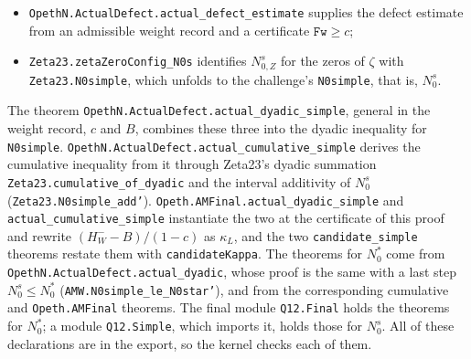 \documentclass[11pt]{article}
\theoremstyle{definition}
\newcommand{\eps}{\varepsilon}
\begin{document}
\begin{sloppypar}
\begin{itemize}
configuration $Z$ that satisfies the analytic inputs of Zeta23, any $0<c<1$,
$B\ge0$ and any defect estimate with these $c$ and $B$, that for every
$\eps>0$ and all large $T$,
$\big((H_W^--B)/(1-c)-\eps\big)N_Z(T,2T)\le N^s_{0,Z}(T,2T)$, where $N^s_{0,Z}$
counts the simple on-line points of $Z$;
\item \texttt{OpethN.\allowbreak ActualDefect.\allowbreak actual\_defect\_estimate}
supplies the defect estimate from an admissible weight record and a
certificate $\texttt{Fw}\ge c$;
\item \texttt{Zeta23.\allowbreak zetaZeroConfig\_N0s} identifies $N^s_{0,Z}$ for
the zeros of $\zeta$ with \texttt{Zeta23.N0simple}, which unfolds to the
challenge's \texttt{N0simple}, that is, $N_0^s$.
\end{itemize}
The theorem \texttt{OpethN.\allowbreak ActualDefect.\allowbreak actual\_dyadic\_simple},
general in the weight record, $c$ and $B$, combines these three into the
dyadic inequality for \texttt{N0simple}.
\texttt{OpethN.\allowbreak ActualDefect.\allowbreak actual\_cumulative\_simple}
derives the cumulative inequality from it through Zeta23's dyadic summation
\texttt{Zeta23.\allowbreak cumulative\_of\_dyadic} and the interval additivity
of $N_0^s$ (\texttt{Zeta23.\allowbreak N0simple\_add'}).
\texttt{Opeth.\allowbreak AMFinal.\allowbreak actual\_dyadic\_simple} and
\texttt{actual\_cumulative\_simple} instantiate the two at the certificate of
this proof and rewrite $(H_W^--B)/(1-c)$ as $\kappa_L$, and the two
\texttt{candidate\_simple} theorems restate them with \texttt{candidateKappa}.
The theorems for $N_0^*$ come from \texttt{OpethN.\allowbreak ActualDefect.\allowbreak actual\_dyadic},
whose proof is the same with a last step $N_0^s\le N_0^*$
(\texttt{AMW.N0simple\_le\_N0star'}), and from the corresponding cumulative
and \texttt{Opeth.\allowbreak AMFinal} theorems. The final module
\texttt{Q12.Final} holds the theorems for $N_0^*$; a module
\texttt{Q12.Simple}, which imports it, holds those for $N_0^s$. All of these
declarations are in the export, so the kernel checks each of them.


\end{sloppypar}
\end{document}
